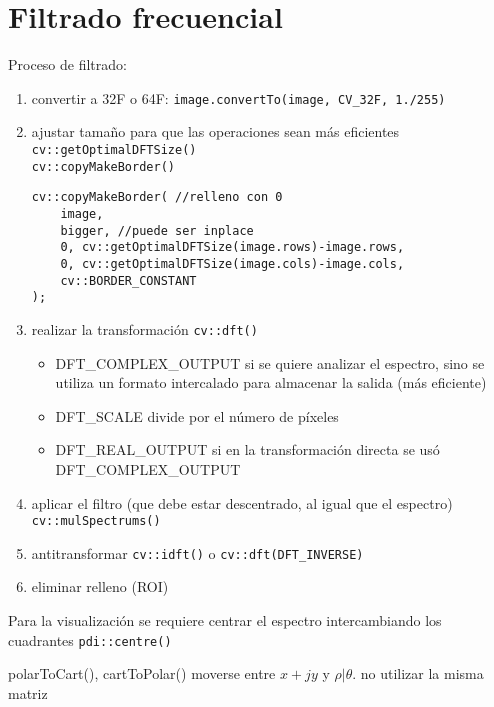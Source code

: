 \documentclass[oneside,a4paper]{book}
\begin{document}
\chapter{Filtrado frecuencial}
	Proceso de filtrado:
	\begin{enumerate}
		\item convertir a 32F o 64F: \verb|image.convertTo(image, CV_32F, 1./255)|
		\item ajustar tamaño para que las operaciones sean más eficientes %
			\verb|cv::getOptimalDFTSize()|\\
			\verb|cv::copyMakeBorder()|
			\begin{lstlisting}
cv::copyMakeBorder( //relleno con 0
	image,
	bigger, //puede ser inplace
	0, cv::getOptimalDFTSize(image.rows)-image.rows,
	0, cv::getOptimalDFTSize(image.cols)-image.cols,
	cv::BORDER_CONSTANT
);
			\end{lstlisting}
		\item realizar la transformación
			\verb|cv::dft()|
			\begin{itemize}
				\item DFT\_COMPLEX\_OUTPUT si se quiere analizar el espectro,
					sino se utiliza un formato intercalado para almacenar la salida (más eficiente)
				\item DFT\_SCALE divide por el número de píxeles
				\item DFT\_REAL\_OUTPUT si en la transformación directa se usó DFT\_COMPLEX\_OUTPUT %

			\end{itemize}
		\item aplicar el filtro (que debe estar descentrado, al igual que el espectro)
			\verb|cv::mulSpectrums()|
		\item antitransformar
			\verb|cv::idft()| o
			\verb|cv::dft(DFT_INVERSE)|
		\item eliminar relleno (ROI)
	\end{enumerate}

	Para la visualización se requiere centrar el espectro intercambiando los cuadrantes
	\verb|pdi::centre()|

polarToCart(), cartToPolar()
	moverse entre $x+jy$ y $\rho|\theta$.
	no utilizar la misma matriz %

\end{document}
